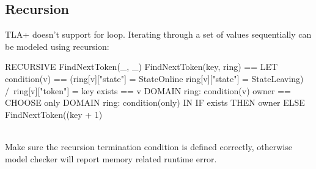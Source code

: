 \subsection{Recursion}

TLA+ doesn't support for loop. Iterating through a set of values 
sequentially can be modeled using recursion:\\
\begin{tla}
RECURSIVE FindNextToken(_, _)
FindNextToken(key, ring) ==
    LET 
        condition(v) == 
            (ring[v]["state"] = StateOnline \/ ring[v]["state"] = StateLeaving)
                /\ ring[v]["token"] = key
        exists == \E v \in DOMAIN ring: condition(v)
        owner == CHOOSE only \in DOMAIN ring: condition(only)
    IN 
        IF exists THEN
            owner
        ELSE 
            FindNextToken((key + 1) %
\end{tla}
\begin{tlatex}
%
%
%
%
%
%
%
%
%
%
\end{tlatex}\\

Make sure the recursion termination condition is defined correctly, otherwise
model checker will report memory related runtime error.

% 
